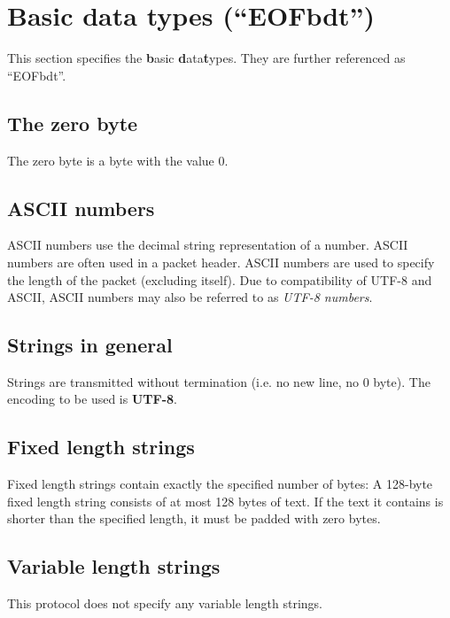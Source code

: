 \section{Basic data types ("`EOFbdt"')}
This section specifies the \textbf{b}asic \textbf{d}ata\textbf{t}ypes. 
They are further referenced as "`EOFbdt"'.
\subsection{The zero byte}
The zero byte is a byte with the value 0.
\subsection{ASCII numbers}
ASCII numbers use the decimal string representation of a number.
ASCII numbers are often used in a packet header.
ASCII numbers are used to specify the length of the packet (excluding itself).
Due to compatibility of UTF-8 and ASCII, ASCII numbers may also be referred to
as \textit{UTF-8 numbers}.
\subsection{Strings in general}
Strings are transmitted without termination (i.e. no new line, no 0 byte).
The encoding to be used is \textbf{UTF-8}\cite{utf8}.
\subsection{Fixed length strings}
Fixed length strings contain exactly the specified number of bytes:
A 128-byte fixed length string consists of at most 128 bytes of text.
If the text it contains is shorter than the specified length,
it must be padded with zero bytes.
\subsection{Variable length strings}
This protocol does not specify any variable length strings.
